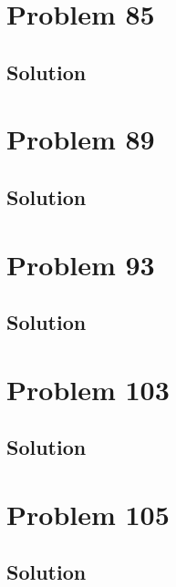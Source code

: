 \documentclass[12pt]{article}
\begin{document}
    \pagebreak
    \section{Problem 85}

    \subsection{Solution}

    \pagebreak
    \section{Problem 89}

    \subsection{Solution}

    \pagebreak
    \section{Problem 93}

    \subsection{Solution}

    \pagebreak
    \section{Problem 103}

    \subsection{Solution}

    \pagebreak
    \section{Problem 105}

    \subsection{Solution}

    \pagebreak

    \tableofcontents
\end{document}
